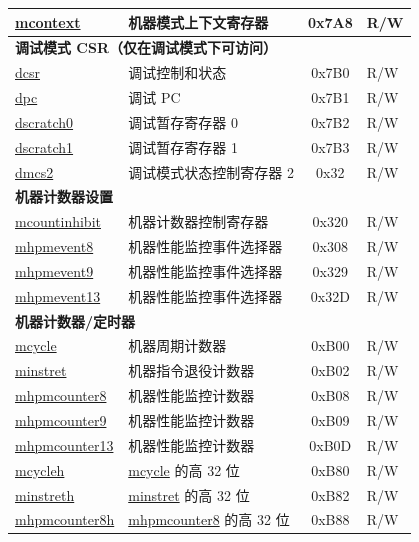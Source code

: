 \begin{longtable}{ | p{4.0cm} | p{8.4cm} | c | l | }
\hyperref[regdesc:MCONTEXT]{mcontext} & 机器模式上下文寄存器 & 0x7A8 & R/W \\\hline
\multicolumn{4}{|l|}{\textbf{调试模式 CSR（仅在调试模式下可访问）}} \\\hline
\hyperref[regdesc:DCSR]{dcsr} & 调试控制和状态 & 0x7B0 & R/W \\\hline
\hyperref[regdesc:DPC]{dpc} & 调试 PC & 0x7B1 & R/W \\\hline
\hyperref[regdesc:DSCRATCH0]{dscratch0} & 调试暂存寄存器 0 & 0x7B2 & R/W \\\hline
\hyperref[regdesc:DSCRATCH1]{dscratch1} & 调试暂存寄存器 1 & 0x7B3 & R/W \\\hline
\hyperref[regdesc:dmcs2]{dmcs2} & 调试模式状态控制寄存器 2 & 0x32 & R/W \\\hline
\multicolumn{4}{|l|}{\textbf{机器计数器设置}} \\\hline
\hyperref[regdesc:MCOUNTINHIBIT]{mcountinhibit} & 机器计数器控制寄存器 & 0x320 & R/W \\\hline
\hyperref[regdesc:MHPMEVENT8]{mhpmevent8} & 机器性能监控事件选择器 & 0x308 & R/W \\\hline
\hyperref[regdesc:MHPMEVENT9]{mhpmevent9} & 机器性能监控事件选择器 & 0x329& R/W \\\hline
\hyperref[regdesc:MHPMEVENT13]{mhpmevent13} & 机器性能监控事件选择器 & 0x32D & R/W \\\hline
\multicolumn{4}{|l|}{\textbf{机器计数器/定时器}} \\\hline
\hyperref[regdesc:MCYCLE]{mcycle} & 机器周期计数器 & 0xB00 & R/W \\\hline
\hyperref[regdesc:MINSTRET]{minstret} & 机器指令退役计数器 & 0xB02 & R/W \\\hline
\hyperref[regdesc:MHPMCOUNTER8]{mhpmcounter8} & 机器性能监控计数器 & 0xB08 & R/W \\\hline
\hyperref[regdesc:MHPMCOUNTER9]{mhpmcounter9} & 机器性能监控计数器 & 0xB09 & R/W \\\hline
\hyperref[regdesc:MHPMCOUNTER13]{mhpmcounter13} & 机器性能监控计数器 & 0xB0D & R/W \\\hline
\hyperref[regdesc:MCYCLEH]{mcycleh} & \hyperref[regdesc:MCYCLE]{mcycle} 的高 32 位 & 0xB80 & R/W \\\hline
\hyperref[regdesc:MINSTRETH]{minstreth} & \hyperref[regdesc:MINSTRET]{minstret} 的高 32 位 & 0xB82 & R/W \\\hline
\hyperref[regdesc:MHPMCOUNTER8H]{mhpmcounter8h} & \hyperref[regdesc:MHPMCOUNTER8]{mhpmcounter8} 的高 32 位 & 0xB88 & R/W \\\hline

\end{longtable}
